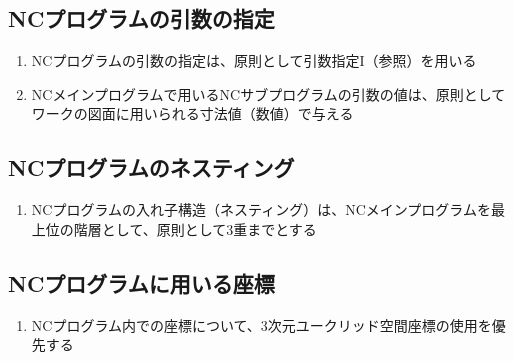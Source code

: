 \subsection{NCプログラムの引数の指定}
\begin{enumerate}[label=\alph*)]
\item NCプログラムの引数の指定は、原則として引数指定I（参照）を用いる
\item {}NCメインプログラムで用いるNCサブプログラムの引数の値は、原則としてワークの図面に用いられる寸法値（数値）で与える
\end{enumerate}


\subsection{NCプログラムのネスティング}
\begin{enumerate}[label=\alph*)]
\item NCプログラムの入れ子構造（ネスティング）は、NCメインプログラムを最上位の階層として、原則として3重までとする
\end{enumerate}


\subsection{NCプログラムに用いる座標}
\begin{enumerate}[label=\alph*)]
\item NCプログラム内での座標について、3次元ユークリッド空間座標の使用を優先する
\end{enumerate}


